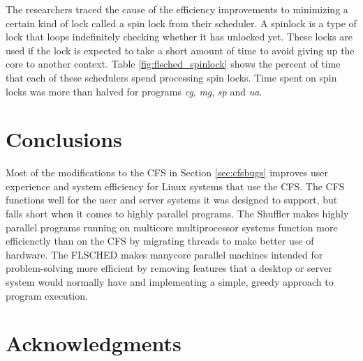 \documentclass{sig-alternate}
\begin{document}
The researchers traced the cause of the efficiency improvements to minimizing a certain kind of lock called a spin lock from their scheduler. A spinlock is a type of lock that loops indefinitely checking whether it has unlocked yet. These locks are used if the lock is expected to take a short amount of time to avoid giving up the core to another context. Table \ref{fig:flsched_spinlock} shows the percent of time that each of these schedulers spend processing spin locks. Time spent on spin locks was more than halved for programs \textit{cg}, \textit{mg}, \textit{sp} and \textit{ua}.~\cite{Jo:2017}


\section{Conclusions}
\label{sec:conclusions}

Most of the modifications to the CFS in Section \ref{sec:cfsbugs} improves user experience and system efficiency for Linux systems that use the CFS. The CFS functions well for the user and server systems it was designed to support, but falls short when it comes to highly parallel programs. The Shuffler makes highly parallel programs running on multicore multiprocessor systems function more efficienctly than on the CFS by migrating threads to make better use of hardware. The FLSCHED makes manycore parallel machines intended for problem-solving more efficient by removing features that a desktop or server system would normally have and implementing a simple, greedy approach to program execution.

\section*{Acknowledgments}
\label{sec:acknowledgments}


  
\end{document}
